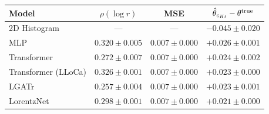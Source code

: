 \begin{tabular}{lccc}
\toprule
Model & $\rho(\log r)$ & MSE & $\hat{\theta}_{c_{Ht}} - \theta^{\rm true}$ \\
\midrule
2D Histogram & — & — & $-0.045 \pm 0.020$ \\
MLP & $0.320 \pm 0.005$ & $0.007 \pm 0.000$ & $+0.026 \pm 0.001$ \\
Transformer & $0.272 \pm 0.007$ & $0.007 \pm 0.000$ & $+0.024 \pm 0.002$ \\
Transformer (LLoCa) & $0.326 \pm 0.001$ & $0.007 \pm 0.000$ & $+0.023 \pm 0.000$ \\
LGATr & $0.257 \pm 0.004$ & $0.007 \pm 0.000$ & $+0.023 \pm 0.001$ \\
LorentzNet & $0.298 \pm 0.001$ & $0.007 \pm 0.000$ & $+0.021 \pm 0.000$ \\
\bottomrule
\end{tabular}
